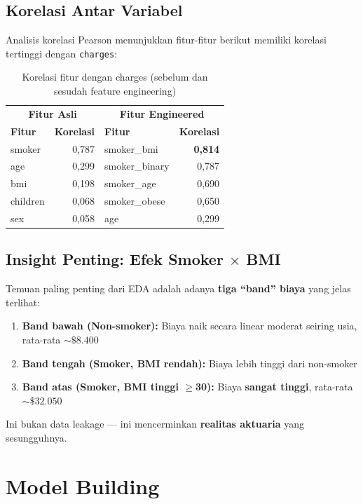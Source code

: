 \documentclass[12pt,a4paper]{article}
\begin{document}
\subsection{Korelasi Antar Variabel}
Analisis korelasi Pearson menunjukkan fitur-fitur berikut memiliki korelasi tertinggi dengan \texttt{charges}:

\begin{table}[h!]
\centering
\caption{Korelasi fitur dengan charges (sebelum dan sesudah feature engineering)}
\begin{tabular}{lr|lr}
\toprule
\multicolumn{2}{c|}{\textbf{Fitur Asli}} & \multicolumn{2}{c}{\textbf{Fitur Engineered}} \\
\textbf{Fitur} & \textbf{Korelasi} & \textbf{Fitur} & \textbf{Korelasi} \\
\midrule
smoker   & 0,787 & smoker\_bmi    & \textbf{0,814} \\
age      & 0,299 & smoker\_binary & 0,787 \\
bmi      & 0,198 & smoker\_age    & 0,690 \\
children & 0,068 & smoker\_obese  & 0,650 \\
sex      & 0,058 & age            & 0,299 \\
\bottomrule
\end{tabular}
\end{table}

\subsection{Insight Penting: Efek Smoker $\times$ BMI}
Temuan paling penting dari EDA adalah adanya \textbf{tiga ``band'' biaya} yang jelas terlihat:
\begin{enumerate}
    \item \textbf{Band bawah (Non-smoker):} Biaya naik secara linear moderat seiring usia, rata-rata ${\sim}\$8.400$
    \item \textbf{Band tengah (Smoker, BMI rendah):} Biaya lebih tinggi dari non-smoker
    \item \textbf{Band atas (Smoker, BMI tinggi $\geq$30):} Biaya \textbf{sangat tinggi}, rata-rata ${\sim}\$32.050$
\end{enumerate}

Ini bukan data leakage — ini mencerminkan \textbf{realitas aktuaria} yang sesungguhnya.


\section{Model Building}
\end{document}
